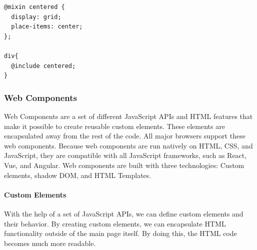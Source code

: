 \begin{lstlisting}[style=htmlcssjs]
@mixin centered {
  display: grid;
  place-items: center;
}; 

div{
  @include centered; 
}
\end{lstlisting}








\subsubsection{Web Components}%
\label{sub:Web Components}
Web Components are a set of different JavaScript APIs and HTML features that make it possible to create reusable custom elements\cite{WebComponentsMDN}. These elements are encapsulated away from the rest of the code. All major browsers support these web components. Because web components are run natively on HTML, CSS, and JavaScript, they are compatible with all JavaScript frameworks, such as React, Vue, and Angular. Web components are built with three technologies: Custom elements, shadow DOM, and HTML Templates. 

\paragraph{Custom Elements}
With the help of a set of JavaScript APIs, we can define custom elements and their behavior. By creating custom elements, we can encapsulate HTML functionality outside of the main page itself. By doing this, the HTML code becomes much more readable. 

